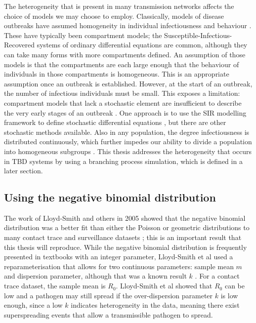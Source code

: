 \documentclass{article}
\begin{document}
The heterogeneity that is present in many transmission networks affects the choice of models we may choose to employ. Classically, models of disease outbreaks have assumed homogeneity in individual infectiousness and behaviour \cite{Garske2008}. These have typically been compartment models; the Susceptible-Infectious-Recovered systems of ordinary differential equations are common, although they can take many forms with more compartments defined. An assumption of those models is that the compartments are each large enough that the behaviour of individuals in those compartments is homogeneous. This is an appropriate assumption once an outbreak is established. However, at the start of an outbreak, the number of infectious individuals must be small. This exposes a limitation: compartment models that lack a stochastic element are insufficient to describe the very early stages of an outbreak \cite{Brauer2008a}. One approach is to use the SIR modelling framework to define stochastic differential equations \cite{Allen2017}, but there are other stochastic methods available. Also in any population, the degree infectiousness is distributed continuously, which further impedes our ability to divide a population into homogeneous subgroups \cite{LloydSmith2005}. This thesis addresses the heterogeneity that occurs in TBD systems by using a branching process simulation, which is defined in a later section.

\subsection{Using the negative binomial distribution}

The work of Lloyd-Smith and others in 2005 showed that the negative binomial distribution was a better fit than either the Poisson or geometric distributions to many contact trace and surveillance datasets \cite{LloydSmith2005}; this is an important result that this thesis will reproduce. While the negative binomial distribution is frequently presented in textbooks with an integer parameter, Lloyd-Smith et al used a reparameterisation that allows for two continuous parameters: sample mean $ m $ and dispersion parameter, although that was a known result $ k $ \cite{Rice2007}. For a contact trace dataset, the sample mean is $ R_0 $. Lloyd-Smith et al showed that $ R_0 $ can be low and a pathogen may still spread if the over-dispersion parameter $ k $ is low enough, since a low $ k $ indicates heterogeneity in the data, meaning there exist superspreading events that allow a transmissible pathogen to spread.
\end{document}
